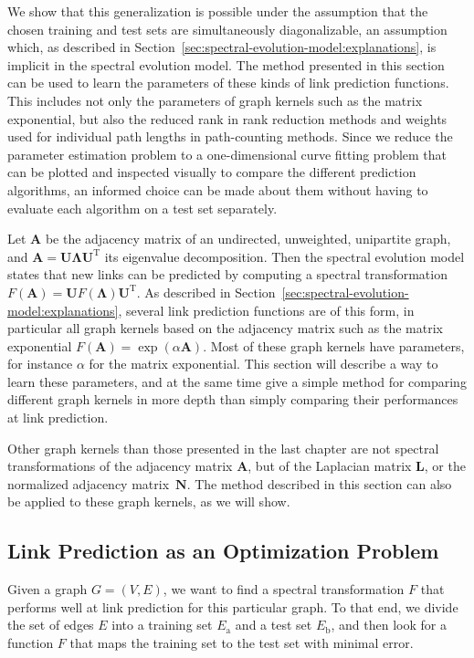 \documentclass[11pt,a4paper]{book}
\begin{document}
We show that this generalization is possible under the assumption that
the chosen training and test sets are simultaneously diagonalizable,
an assumption which, as described in
Section~\ref{sec:spectral-evolution-model:explanations}, is implicit in
the spectral evolution model. 
The method presented in this section
can be used to learn the parameters of these kinds of link prediction
functions. 
This includes not only the parameters of graph kernels such as the
matrix exponential, but also the reduced rank in rank reduction methods
and weights used for individual path lengths in path-counting methods. 
Since we reduce the parameter
estimation problem to a one-dimensional curve fitting problem that can
be plotted and inspected visually to compare the different prediction
algorithms, an informed choice can be made about them without having to
evaluate each algorithm on a test set separately.

Let $\mathbf A$ be the adjacency matrix of an undirected, unweighted, unipartite
graph, and $\mathbf A = \mathbf U \mathbf \Lambda \mathbf U^{\mathrm T}$ its
eigenvalue decomposition.  Then the spectral evolution model states that
new links can be predicted by computing a spectral transformation
$F(\mathbf A)= \mathbf U F(\mathbf \Lambda) \mathbf U^{\mathrm T}$.  As
described in Section~\ref{sec:spectral-evolution-model:explanations},
several link prediction functions are of this form, in
particular all graph kernels based on the adjacency matrix such as the
matrix exponential 
$F(\mathbf A) = \exp(\alpha \mathbf A)$.  Most of these graph kernels
have parameters, for instance $\alpha$ for the matrix exponential.  
This section will describe a way to learn these parameters,
and at the same time give a simple method for comparing different graph
kernels in more depth than simply comparing their performances at link
prediction.

Other graph kernels than those presented in
the last chapter 
are not spectral transformations of the adjacency 
matrix $\mathbf A$, but of the Laplacian matrix $\mathbf L$, or the normalized
adjacency matrix~$\mathbf N$.  The method described in this section can
also be applied to these graph kernels, as we will show. 

\subsection{Link Prediction as an Optimization Problem}
Given a graph $G=(V,E)$, we want to find a spectral transformation $F$ that
performs well at link prediction for this particular graph.  
To that end, we divide the set of edges 
$E$ into a training set $E_{\mathrm a}$ and a test set $E_{\mathrm b}$, and then look for a
function $F$ that maps the training set to the test set with minimal error. 
\end{document}

